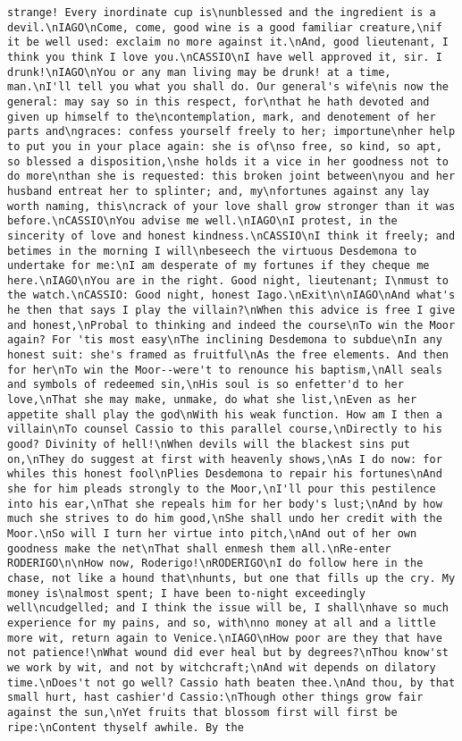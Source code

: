 \begin{verbatim}
strange! Every inordinate cup is\nunblessed and the ingredient is a devil.\nIAGO\nCome, come, good wine is a good familiar creature,\nif it be well used: exclaim no more against it.\nAnd, good lieutenant, I think you think I love you.\nCASSIO\nI have well approved it, sir. I drunk!\nIAGO\nYou or any man living may be drunk! at a time, man.\nI'll tell you what you shall do. Our general's wife\nis now the general: may say so in this respect, for\nthat he hath devoted and given up himself to the\ncontemplation, mark, and denotement of her parts and\ngraces: confess yourself freely to her; importune\nher help to put you in your place again: she is of\nso free, so kind, so apt, so blessed a disposition,\nshe holds it a vice in her goodness not to do more\nthan she is requested: this broken joint between\nyou and her husband entreat her to splinter; and, my\nfortunes against any lay worth naming, this\ncrack of your love shall grow stronger than it was before.\nCASSIO\nYou advise me well.\nIAGO\nI protest, in the sincerity of love and honest kindness.\nCASSIO\nI think it freely; and betimes in the morning I will\nbeseech the virtuous Desdemona to undertake for me:\nI am desperate of my fortunes if they cheque me here.\nIAGO\nYou are in the right. Good night, lieutenant; I\nmust to the watch.\nCASSIO: Good night, honest Iago.\nExit\n\nIAGO\nAnd what's he then that says I play the villain?\nWhen this advice is free I give and honest,\nProbal to thinking and indeed the course\nTo win the Moor again? For 'tis most easy\nThe inclining Desdemona to subdue\nIn any honest suit: she's framed as fruitful\nAs the free elements. And then for her\nTo win the Moor--were't to renounce his baptism,\nAll seals and symbols of redeemed sin,\nHis soul is so enfetter'd to her love,\nThat she may make, unmake, do what she list,\nEven as her appetite shall play the god\nWith his weak function. How am I then a villain\nTo counsel Cassio to this parallel course,\nDirectly to his good? Divinity of hell!\nWhen devils will the blackest sins put on,\nThey do suggest at first with heavenly shows,\nAs I do now: for whiles this honest fool\nPlies Desdemona to repair his fortunes\nAnd she for him pleads strongly to the Moor,\nI'll pour this pestilence into his ear,\nThat she repeals him for her body's lust;\nAnd by how much she strives to do him good,\nShe shall undo her credit with the Moor.\nSo will I turn her virtue into pitch,\nAnd out of her own goodness make the net\nThat shall enmesh them all.\nRe-enter RODERIGO\n\nHow now, Roderigo!\nRODERIGO\nI do follow here in the chase, not like a hound that\nhunts, but one that fills up the cry. My money is\nalmost spent; I have been to-night exceedingly well\ncudgelled; and I think the issue will be, I shall\nhave so much experience for my pains, and so, with\nno money at all and a little more wit, return again to Venice.\nIAGO\nHow poor are they that have not patience!\nWhat wound did ever heal but by degrees?\nThou know'st we work by wit, and not by witchcraft;\nAnd wit depends on dilatory time.\nDoes't not go well? Cassio hath beaten thee.\nAnd thou, by that small hurt, hast cashier'd Cassio:\nThough other things grow fair against the sun,\nYet fruits that blossom first will first be ripe:\nContent thyself awhile. By the 
\end{verbatim}

